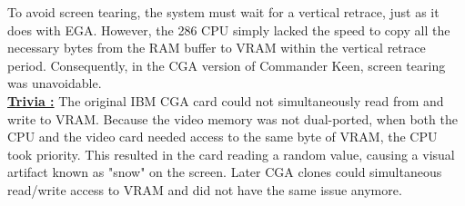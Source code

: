 \documentclass[book.tex]{subfiles}
\begin{document}
\par
To avoid screen tearing, the system must wait for a vertical retrace, just as it does with EGA. However, the 286 CPU simply lacked the speed to copy all the necessary bytes from the RAM buffer to VRAM within the vertical retrace period. Consequently, in the CGA version of Commander Keen, screen tearing was unavoidable.\\

\textbf{\underline{Trivia :}} The original IBM CGA card could not simultaneously read from and write to VRAM. Because the video memory was not dual-ported, when both the CPU and the video card needed access to the same byte of VRAM, the CPU took priority. This resulted in the card reading a random value, causing a visual artifact known as "snow" on the screen. Later CGA clones could simultaneous read/write access to VRAM and did not have the same issue anymore.\\

\par
\begin{minipage}{\textwidth}
  
\end{minipage}
\label{cga_screen_refresh}
\par
\end{document}
